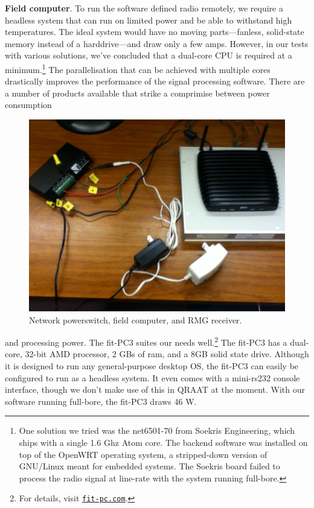 \documentclass[letter]{article}
\newcounter{foot}
\begin{document}
\textbf{Field computer}. To run the software defined radio remotely, we require a headless system
that can run on limited power and be able to withstand high temperatures. The ideal system would 
have no moving parts---fanless, solid-state memory instead of a harddrive---and draw only a few 
amps. However, in our tests with various solutions, we've concluded that a dual-core CPU is 
required at a minimum.\footnote{One solution we tried was the net6501-70 from Soekris Engineering, which
ships with a single 1.6 Ghz Atom core. The backend software was installed on top of the OpenWRT operating 
system, a stripped-down version of GNU/Linux meant for embedded systems. The Soekris board failed to 
process the radio signal at line-rate with the system running full-bore.} The parallelisation that 
can be achieved with multiple cores drastically improves the performance of the signal processing
software. There are a number of products available that strike a comprimise between power consumption 
\begin{figure}
  \vspace{-10pt}
  \begin{center}
    \includegraphics[scale=0.24]{pictures/power_rmg_computer.JPG}
  \end{center}
  \caption{Network powerswitch, field computer, and RMG receiver.}
  \vspace{-10pt}
\end{figure}
and processing power. The fit-PC3 suites our needs well.\footnote{For details, visit
\href{http://www.fit-pc.com}{\tt fit-pc.com}.} The fit-PC3 has a dual-core, 32-bit AMD
processor, 2 GBs of ram, and a 8GB solid state drive. Although it is designed to run 
any general-purpose desktop OS, the fit-PC3 can easily be configured to 
run as a headless system. It even comes with a mini-rs232 console interface, though 
we don't make use of this in QRAAT at the moment. With our software running full-bore, the fit-PC3 
draws 46 W. 
\end{document}
